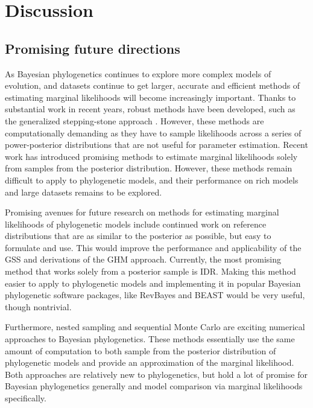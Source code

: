 \section{Discussion}

\subsection{Promising future directions}

As Bayesian phylogenetics continues to explore more complex models of
evolution, and datasets continue to get larger, accurate and efficient methods
of estimating marginal likelihoods will become increasingly important.
Thanks to substantial work in recent years, robust methods have been developed,
such as the generalized stepping-stone approach \citep{Fan2011}.
However, these methods are computationally demanding as they have to sample
likelihoods across a series of power-posterior distributions that are not
useful for parameter estimation.
Recent work has introduced promising methods to estimate marginal likelihoods
solely from samples from the posterior distribution.
However, these methods remain difficult to apply to phylogenetic models, and
their performance on rich models and large datasets remains to be explored.

Promising avenues for future research on methods for estimating marginal
likelihoods of phylogenetic models include continued work on reference
distributions that are as similar to the posterior as possible, but easy to
formulate and use.
This would improve the performance and applicability of the GSS and derivations
of the GHM approach.
Currently, the most promising method that works solely from a posterior
sample is IDR.
Making this method easier to apply to phylogenetic models and implementing
it in popular Bayesian phylogenetic software packages,
like
RevBayes \citep{Hohna2016}
and
BEAST \citep{Suchard2018,Bouckaert2014}
would be very useful, though nontrivial.

Furthermore, nested sampling and sequential Monte Carlo are exciting numerical
approaches to Bayesian phylogenetics.
These methods essentially use the same amount of computation to both sample
from the posterior distribution of phylogenetic models and provide an
approximation of the marginal likelihood.
Both approaches are relatively new to phylogenetics, but hold a lot of promise
for Bayesian phylogenetics generally and model comparison via marginal
likelihoods specifically.



